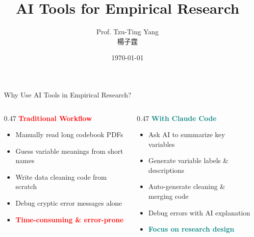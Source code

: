 \documentclass[hyperref={pdfpagelabels=false}]{beamer}
\title[]
{AI Tools for Empirical Research}
\author
{Prof. Tzu-Ting Yang \\ 楊子霆}
\institute{Institute of Economics, Academia Sinica \\ 中央研究院經濟研究所}
\date{\today}
\begin{document}

\begin{frame}{}
\titlepage
\end{frame}



\begin{frame}{Why Use AI Tools in Empirical Research?}
\begin{columns}[T]

\begin{column}{0.47\textwidth}
\textbf{\textcolor{red}{Traditional Workflow}}
\vspace{0.2cm}
\begin{itemize}
	\item Manually read long codebook PDFs
	\vspace{0.15cm}
	\item Guess variable meanings from short names
	\vspace{0.15cm}
	\item Write data cleaning code from scratch
	\vspace{0.15cm}
	\item Debug cryptic error messages alone
	\vspace{0.3cm}
	\item[\textcolor{red}{$\Rightarrow$}] \textbf{\textcolor{red}{Time-consuming \& error-prone}}
\end{itemize}
\end{column}

\begin{column}{0.47\textwidth}
\textbf{\textcolor{teal}{With Claude Code}}
\vspace{0.2cm}
\begin{itemize}
	\item Ask AI to summarize key variables
	\vspace{0.15cm}
	\item Generate variable labels \& descriptions
	\vspace{0.15cm}
	\item Auto-generate cleaning \& merging code
	\vspace{0.15cm}
	\item Debug errors with AI explanation
	\vspace{0.3cm}
	\item[\textcolor{teal}{$\Rightarrow$}] \textbf{\textcolor{teal}{Focus on research design}}
\end{itemize}
\end{column}

\end{columns}

\end{frame}
\end{document}
